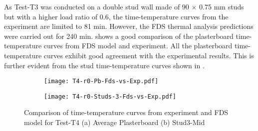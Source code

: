 As Test-T3 was conducted on a double stud wall made of 90 $\times$ 0.75 mm studs but with a higher load ratio of 0.6, the time-temperature curves from the experiment are limited to 81 min. However, the FDS thermal analysis predictions were carried out for 240 min.  shows a good comparison of the plasterboard time-temperature curves from FDS model and experiment. All the plasterboard time-temperature curves exhibit good agreement with the experimental results. This is further evident from the stud time-temperature curves shown in .
\begin{figure}[!htbp]
	\centering
	\begin{subfigure}[b]{0.7\textwidth}
		\centering
		\texttt{[image: T4-r0-Pb-Fds-vs-Exp.pdf]}
		\caption{}
		\label{subfig:T4-r0-Pb-Fds-vs-Exp}
	\end{subfigure}
	\begin{subfigure}[b]{0.6\textwidth}
		\centering
		\texttt{[image: T4-r0-Studs-3-Fds-vs-Exp.pdf]}
		\caption{}
		\label{subfig:T4-r0-Studs-3-Fds-vs-Exp}
	\end{subfigure}
	   \caption{Comparison of time-temperature curves from experiment and FDS model for Test-T4 (a) Average Plasterboard (b) Stud3-Mid}
	   \label{fig:fds-output-pb-studs-t4}
\end{figure}


